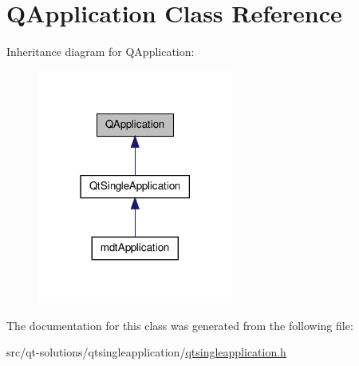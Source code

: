 \hypertarget{class_q_application}{\section{Q\-Application Class Reference}
\label{class_q_application}
}


Inheritance diagram for Q\-Application\-:
\nopagebreak
\begin{figure}[H]
\begin{center}
\leavevmode
\includegraphics[width=182pt]{class_q_application__inherit__graph}
\end{center}
\end{figure}


The documentation for this class was generated from the following file\-:\begin{DoxyCompactItemize}
\item 
src/qt-\/solutions/qtsingleapplication/\hyperlink{qtsingleapplication_8h}{qtsingleapplication.\-h}\end{DoxyCompactItemize}

